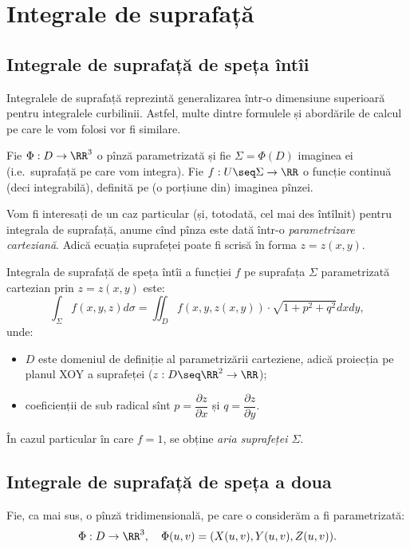 \chapter{Integrale de suprafață}

\section{Integrale de suprafață de speța întîi}
Integralele de suprafață reprezintă generalizarea într-o dimensiune
superioară pentru integralele curbilinii. Astfel, multe dintre formulele
și abordările de calcul pe care le vom folosi vor fi similare.

Fie $ \Phi : D \to \RR^3 $ o pînză parametrizată și fie $ \Sigma = \Phi(D) $
imaginea ei (i.e.\ suprafață pe care vom integra). Fie $ f : U \seq \Sigma \to \RR $
o funcție continuă (deci integrabilă), definită pe (o porțiune din) imaginea
pînzei.

Vom fi interesați de un caz particular (și, totodată, cel mai des întîlnit) pentru
integrala de suprafață, anume cînd pînza este dată într-o \emph{parametrizare %
  carteziană}. Adică ecuația suprafeței poate fi scrisă în forma $ z = z(x, y) $.

Integrala de suprafață de speța întîi a funcției $ f $ pe suprafața $ \Sigma $
parametrizată cartezian prin $ z = z(x, y) $ este:
\[
  \int_\Sigma f(x, y, z) d\sigma = \iint_D f(x, y, z(x, y)) \cdot %
  \sqrt{1 + p^2 + q^2} dxdy,
\]
unde:
\begin{itemize}
\item $ D $ este domeniul de definiție al parametrizării carteziene,
  adică proiecția pe planul XOY a suprafeței ($ z : D \seq \RR^2 \to \RR $);
\item coeficienții de sub radical sînt $ p = \dfrac{\partial z}{\partial x} $
  și $ q = \dfrac{\partial z}{\partial y} $.
\end{itemize}

În cazul particular în care $ f = 1 $, se obține \emph{aria suprafeței $ \Sigma $}.


\section{Integrale de suprafață de speța a doua}
Fie, ca mai sus, o pînză tridimensională, pe care o considerăm a fi parametrizată:
\[
  \Phi : D \to \RR^3, \quad \Phi(u, v) = (X(u, v), Y(u, v), Z(u, v)).
\]

